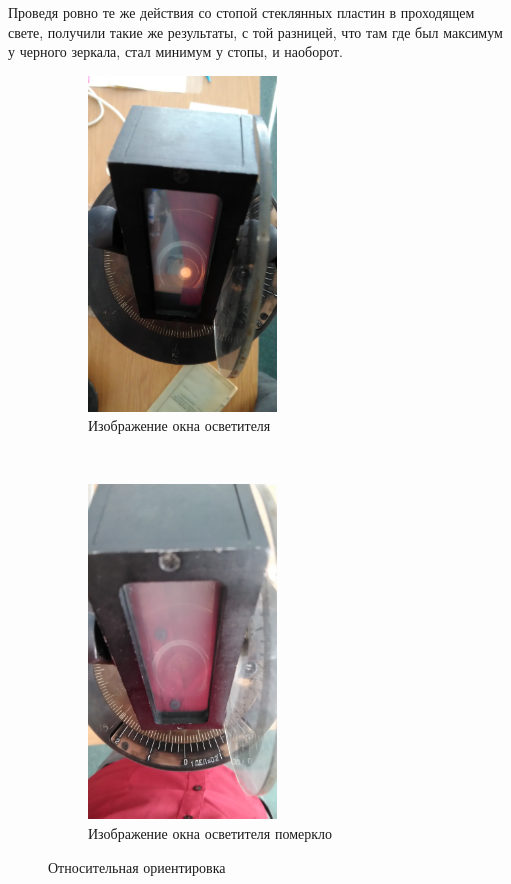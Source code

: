 Проведя ровно те же действия со стопой стеклянных пластин в проходящем свете, получили такие же результаты, с той разницей, что там где был максимум у черного зеркала, стал минимум у стопы, и наоборот.

\begin{figure}[H]
    \centering
    \begin{subfigure}[c]{0.5\textwidth}
        \centering
        \includegraphics[width=5cm]{pic/s90.jpg}
		\caption{Изображение окна осветителя}
		\label{fig:figure11}
    \end{subfigure}%
    ~ 
    \begin{subfigure}[c]{0.5\textwidth}
        \centering
        \includegraphics[width=5cm]{pic/s0.jpg}
		\caption{Изображение окна осветителя померкло}
		\label{fig:figure12}
    \end{subfigure}
    \caption{Относительная ориентировка}

\end{figure} 

